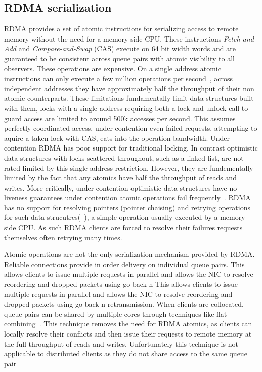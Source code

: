 \subsection{RDMA serialization}
RDMA provides a set of atomic instructions for serializing
access to remote memory without the need for a memory side
CPU. These instructions \textit{Fetch-and-Add} and
\textit{Compare-and-Swap} (CAS) execute on 64 bit width
words and are guaranteed to be consistent across queue pairs
with atomic visibility to all observers. These operations
are expensive. On a single address atomic instructions can
only execute a few million operations per
second~, across independent addresses they
have approximately half the throughput of their non atomic
counterparts. These limitations fundamentally limit data
structures built with them, locks with a single address
requiring both a lock and unlock call to guard access are
limited to around 500k accesses per second. This assumes
perfectly coordinated access, under contention even failed
requests, attempting to aquire a taken lock with CAS, eats
into the operation bandwidth. Under contention RDMA has poor
support for traditional locking. In contrast optimistic data
structures with locks scattered throughout, such as a linked
list, are not rated limited by this single address
restriction. However, they are fundementally limited by the
fact that any atomics have half the throughput of reads and
writes. More critically, under contention optimistic data
structures have no liveness guarantees under contention
atomic operations fail frequently~. RDMA has no support for resolving pointers
(pointer chaising) and retrying operations for such data
strucutres(~\cite{rma}), a simple operation usually executed
by a memory side CPU. As such RDMA clients are forced to
resolve their failures requests themselves often retrying
many times.

Atomic operations are not the only serialization mechanism
provided by RDMA. Reliable connections provide in order
delivery on individual queue pairs. This allows clients to
issue multiple requests in parallel and allows the NIC to
resolve reordering and dropped packets using go-back-n This
allows clients to issue multiple requests in parallel and
allows the NIC to resolve reordering and dropped packets
using go-back-n retransmission. When clients are collocated,
queue pairs can be shared by multiple cores through
techniques like flat combining~\cite{flock,sherman}. This
technique removes the need for RDMA atomics, as clients can
locally resolve their conflicts and then issue their
requests to remote memory at the full throughput of reads
and writes. Unfortunately this technique is not applicable
to distributed clients as they do not share access to the
same queue pair

